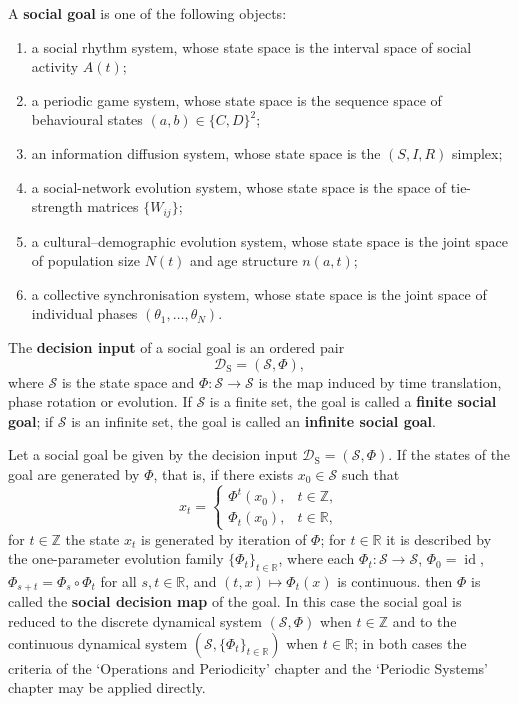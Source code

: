 \begin{definition}\label{def:social_target}
A \textbf{social goal} is one of the following objects:
\begin{enumerate}[label=(\roman*)]
    \item a social rhythm system, whose state space is the interval space of social activity $A(t)$;
    \item a periodic game system, whose state space is the sequence space of behavioural states $(a,b)\in\{C,D\}^2$;
    \item an information diffusion system, whose state space is the $(S,I,R)$ simplex;
    \item a social-network evolution system, whose state space is the space of tie-strength matrices $\{W_{ij}\}$;
    \item a cultural--demographic evolution system, whose state space is the joint space of population size $N(t)$ and age structure $n(a,t)$;
    \item a collective synchronisation system, whose state space is the joint space of individual phases $(\theta_1,\dots,\theta_N)$.
\end{enumerate}
The \textbf{decision input} of a social goal is an ordered pair
\[
\mathcal D_{\mathrm{S}}=(\mathcal S,\Phi),
\]
where $\mathcal S$ is the state space and $\Phi:\mathcal S\to\mathcal S$ is the map induced by time translation, phase rotation or evolution. If $\mathcal S$ is a finite set, the goal is called a \textbf{finite social goal}; if $\mathcal S$ is an infinite set, the goal is called an \textbf{infinite social goal}.
\end{definition}

\begin{definition}\label{def:social_periodization}
Let a social goal be given by the decision input $\mathcal D_{\mathrm{S}}=(\mathcal S,\Phi)$. If the states of the goal are generated by $\Phi$, that is, if there exists $x_0\in\mathcal S$ such that
\[
x_t=\begin{cases}\Phi^t(x_0), & t\in\mathbb Z,\\ \Phi_t(x_0), & t\in\mathbb R,\end{cases}
\]
for $t\in\mathbb Z$ the state $x_t$ is generated by iteration of $\Phi$; for $t\in\mathbb R$ it is described by the one-parameter evolution family $\{\Phi_t\}_{t\in\mathbb R}$, where each $\Phi_t:\mathcal S\to\mathcal S$, $\Phi_0=\operatorname{id}$, $\Phi_{s+t}=\Phi_s\circ\Phi_t$ for all $s,t\in\mathbb R$, and $(t,x)\mapsto\Phi_t(x)$ is continuous.
then $\Phi$ is called the \textbf{social decision map} of the goal. In this case the social goal is reduced to the discrete dynamical system $(\mathcal S,\Phi)$ when $t\in\mathbb Z$ and to the continuous dynamical system $(\mathcal S,\{\Phi_t\}_{t\in\mathbb R})$ when $t\in\mathbb R$; in both cases the criteria of the `Operations and Periodicity' chapter and the `Periodic Systems' chapter may be applied directly.
\end{definition}

